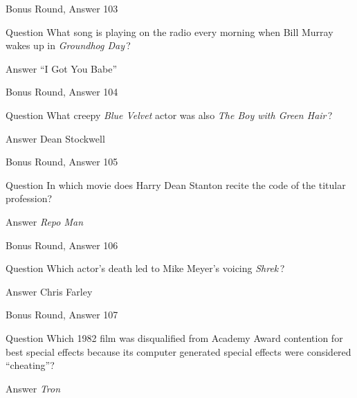 \documentclass[11pt]{beamer}
\begin{document}
\begin{frame}[t]{Bonus Round, Answer 103}
\vspace{2em}
\begin{block}{Question}
What song is playing on the radio every morning when Bill Murray wakes up in \emph{Groundhog Day}\,?
\end{block}
\pause{}
\begin{block}{Answer}
``I Got You Babe''
\end{block}
\end{frame}
    

\begin{frame}[t]{Bonus Round, Answer 104}
\vspace{2em}
\begin{block}{Question}
What creepy \emph{Blue Velvet} actor was also \emph{The Boy with Green Hair}\,?
\end{block}
\pause{}
\begin{block}{Answer}
Dean Stockwell
\end{block}
\end{frame}
    

\begin{frame}[t]{Bonus Round, Answer 105}
\vspace{2em}
\begin{block}{Question}
In which movie does Harry Dean Stanton recite the code of the titular profession?
\end{block}
\pause{}
\begin{block}{Answer}
\emph{Repo Man}
\end{block}
\end{frame}
    

\begin{frame}[t]{Bonus Round, Answer 106}
\vspace{2em}
\begin{block}{Question}
Which actor's death led to Mike Meyer's voicing \emph{Shrek}\,?
\end{block}
\pause{}
\begin{block}{Answer}
Chris Farley
\end{block}
\end{frame}
    

\begin{frame}[t]{Bonus Round, Answer 107}
\vspace{2em}
\begin{block}{Question}
Which 1982 film was disqualified from Academy Award contention for best special effects because its computer generated special effects were considered ``cheating''?
\end{block}
\pause{}
\begin{block}{Answer}
\emph{Tron}
\end{block}
\end{frame}
    
\end{document}
